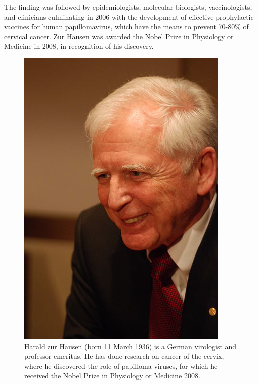 
The finding was followed by epidemiologists, molecular biologists, vaccinologists, and clinicians culminating in 2006 with the development of effective prophylactic vaccines for human papillomavirus, which have the means to prevent 70-80\% of cervical cancer. Zur Hausen was awarded the Nobel Prize in Physiology or Medicine in 2008, in recognition of his discovery.

\begin{figure}[ht]
	\centering
	\includegraphics[scale=0.7]{IMG/zurHausen.png}
	\caption{Harald zur Hausen (born 11 March 1936) is a German virologist and professor emeritus. He has done research on cancer of the cervix, where he discovered the role of papilloma viruses, for which he received the Nobel Prize in Physiology or Medicine 2008.}
	\label{zurHausen}
\end{figure} 

